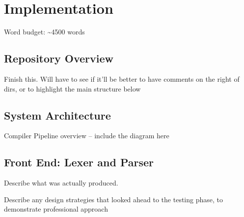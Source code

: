 \documentclass[00-main.tex]{subfiles}
\begin{document}
\chapter{Implementation}

\begin{Comment}
Word budget: \textasciitilde 4500 words
\end{Comment}

\section{Repository Overview}

\DTsetlength{0.2em}{1em}{0.2em}{0.4pt}{2pt}


\begin{Comment}
Finish this. Will have to see if it'll be better to have comments on the right of dirs, or to highlight the main structure below
\end{Comment}

\section{System Architecture}

\begin{Comment}
Compiler Pipeline overview -- include the diagram here
\end{Comment}

\section{Front End: Lexer and Parser}

\begin{Comment}
Describe what was actually produced.

Describe any design strategies that looked ahead to the testing phase, to demonstrate professional approach

\end{Comment}
\end{document}
